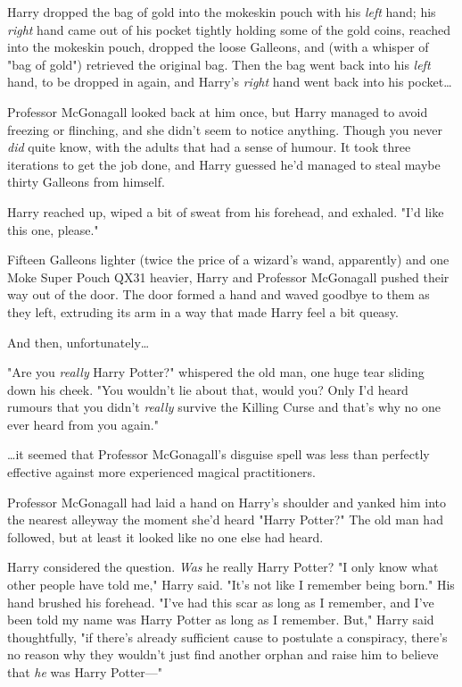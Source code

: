 Harry dropped the bag of gold into the mokeskin pouch with his \emph{left} hand; his \emph{right} hand came out of his pocket tightly holding some of the gold coins, reached into the mokeskin pouch, dropped the loose Galleons, and (with a whisper of "bag of gold") retrieved the original bag. Then the bag went back into his \emph{left} hand, to be dropped in again, and Harry's \emph{right} hand went back into his pocket{\ldots}

Professor McGonagall looked back at him once, but Harry managed to avoid freezing or flinching, and she didn't seem to notice anything. Though you never \emph{did} quite know, with the adults that had a sense of humour. It took three iterations to get the job done, and Harry guessed he'd managed to steal maybe thirty Galleons from himself.

Harry reached up, wiped a bit of sweat from his forehead, and exhaled. "I'd like this one, please."

Fifteen Galleons lighter (twice the price of a wizard's wand, apparently) and one Moke Super Pouch QX31 heavier, Harry and Professor McGonagall pushed their way out of the door. The door formed a hand and waved goodbye to them as they left, extruding its arm in a way that made Harry feel a bit queasy.

And then, unfortunately{\ldots}

"Are you \emph{really} Harry Potter?" whispered the old man, one huge tear sliding down his cheek. "You wouldn't lie about that, would you? Only I'd heard rumours that you didn't \emph{really} survive the Killing Curse and that's why no one ever heard from you again."

{\ldots}it seemed that Professor McGonagall's disguise spell was less than perfectly effective against more experienced magical practitioners.

Professor McGonagall had laid a hand on Harry's shoulder and yanked him into the nearest alleyway the moment she'd heard "Harry Potter?" The old man had followed, but at least it looked like no one else had heard.

Harry considered the question. \emph{Was} he really Harry Potter? "I only know what other people have told me," Harry said. "It's not like I remember being born." His hand brushed his forehead. "I've had this scar as long as I remember, and I've been told my name was Harry Potter as long as I remember. But," Harry said thoughtfully, "if there's already sufficient cause to postulate a conspiracy, there's no reason why they wouldn't just find another orphan and raise him to believe that \emph{he} was Harry Potter---"

